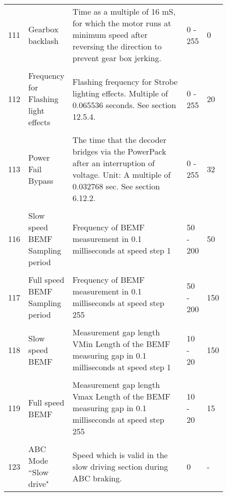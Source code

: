 \begin{tabular}{p{0.075\linewidth} p{0.15\linewidth} p{0.525\linewidth} p{0.06\linewidth} p{0.05\linewidth}}
\\
111 & Gearbox backlash & Time as a multiple of 16 mS, for which the motor runs at minimum speed after reversing the direction to prevent gear box jerking. & 0 - 255 & 0\\
\\
112 & Frequency for Flashing light effects & Flashing frequency for Strobe lighting effects. Multiple of 0.065536 seconds. See section 12.5.4. & 0 - 255 & 20\\
\\
113 & Power Fail Bypass & The time that the decoder bridges via the PowerPack after an interruption of voltage. Unit: A multiple of 0.032768 sec. See section 6.12.2. & 0 - 255 & 32\\
\\
116 & Slow speed BEMF Sampling period & Frequency of BEMF measurement in 0.1 milliseconds at speed step 1 & 50 - 200 & 50\\
\\
117 & Full speed BEMF Sampling period & Frequency of BEMF measurement in 0.1 milliseconds at speed step 255 & 50 - 200 & 150\\
\\
118 & Slow speed BEMF & Measurement gap length VMin Length of the BEMF measuring gap in 0.1 milliseconds at speed step 1 & 10 - 20 & 150\\
\\
119 & Full speed BEMF & Measurement gap length Vmax Length of the BEMF measuring gap in 0.1 milliseconds at speed step 255 & 10 - 20 & 15\\
\\
123 & ABC Mode ``Slow drive" & Speed which is valid in the slow driving section during ABC braking. & 0 & -\\ 
\end{tabular}
\newpage
